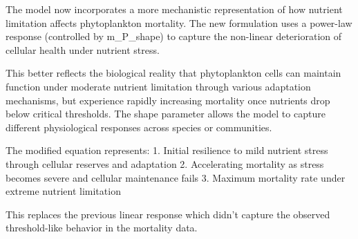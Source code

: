 The model now incorporates a more mechanistic representation of how nutrient limitation affects phytoplankton mortality. The new formulation uses a power-law response (controlled by m_P_shape) to capture the non-linear deterioration of cellular health under nutrient stress.

This better reflects the biological reality that phytoplankton cells can maintain function under moderate nutrient limitation through various adaptation mechanisms, but experience rapidly increasing mortality once nutrients drop below critical thresholds. The shape parameter allows the model to capture different physiological responses across species or communities.

The modified equation represents:
1. Initial resilience to mild nutrient stress through cellular reserves and adaptation
2. Accelerating mortality as stress becomes severe and cellular maintenance fails
3. Maximum mortality rate under extreme nutrient limitation

This replaces the previous linear response which didn't capture the observed threshold-like behavior in the mortality data.

